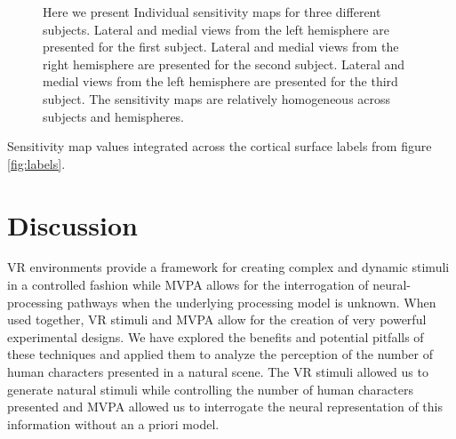 \documentclass[preprint,5p,authoryear]{elsarticle}
\begin{document}
\begin{figure}[p]
\begin{subfigure}{0.3\textwidth}
\caption{}
\label{fig:s3-lh-medial-sensitivity}
\end{subfigure}
\caption{Here we present Individual sensitivity maps for three different subjects. 
Lateral  and medial  views from the left hemisphere are presented for the first subject.
Lateral  and medial  views from the right hemisphere are presented for the second subject.
Lateral  and medial  views from the left hemisphere are presented for the third subject.
The sensitivity maps are relatively homogeneous across subjects and hemispheres.}
\label{fig:individual-sensitivity}
\end{figure}

\begin{table}[p]
\centering

\caption{Sensitivity map values integrated across the cortical surface labels from figure \ref{fig:labels}.}
\label{tab:full-sensitivity}
\end{table}

\section{Discussion}
VR environments provide a framework for creating  complex and dynamic stimuli in a controlled fashion while MVPA allows for the interrogation of neural-processing pathways when the underlying processing model is unknown.
When used together, VR stimuli and MVPA allow for the creation of very powerful experimental designs.
We have explored the benefits and potential pitfalls of these techniques and applied them to analyze the perception of the number of human characters presented in a natural scene.
The VR stimuli allowed us to generate natural stimuli while controlling the number of human characters presented and MVPA allowed us to interrogate the neural representation of this information without an a priori model.
\end{document}
